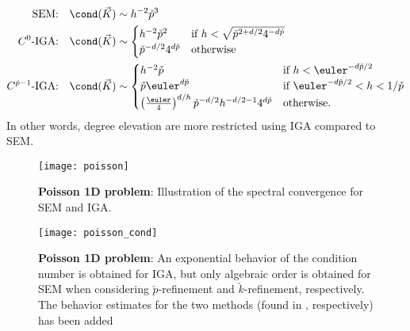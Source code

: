 \begin{align}\label{Eq5:condSEM}
	\text{SEM:}\quad&\cond(\vec{K}) \sim h^{-2}\check{p}^3\\ \label{Eq5:condIGA1}
	C^0\text{-IGA:}\quad&\cond(\vec{K}) \sim \begin{cases}
		h^{-2}\check{p}^2 & \text{if } h < \sqrt{\check{p}^{2+d/2}4^{-d\check{p}}}\\
		\check{p}^{-d/2}4^{d\check{p}} & \text{otherwise}
		\end{cases}\\ \label{Eq5:condIGA2}
	C^{\check{p}-1}\text{-IGA:}\quad&\cond(\vec{K}) \sim \begin{cases}
		h^{-2}\check{p} & \text{if } h < \euler^{-d\check{p}/2}\\
		\check{p}\euler^{d\check{p}} & \text{if } \euler^{-d\check{p}/2} < h < 1/\check{p}\\
		\left(\frac{\euler}{4}\right)^{d/h}\check{p}^{-d/2}h^{-d/2-1}4^{d\check{p}} & \text{otherwise.}
		\end{cases}
\end{align}
In other words, degree elevation are more restricted using IGA compared to SEM.
\begin{figure}
	\centering
	\texttt{[image: poisson]}
	\caption{\textbf{Poisson 1D problem}: Illustration of the spectral convergence for SEM and IGA.}
	\label{Fig5:poisson}
\end{figure}
\begin{figure}
	\centering
	\texttt{[image: poisson\_cond]}
	\caption{\textbf{Poisson 1D problem}: An exponential behavior of the condition number is obtained for IGA, but only algebraic order is obtained for SEM when considering $\check{p}$-refinement and $\check{k}$-refinement, respectively. The behavior estimates for the two methods (found in , respectively) has been added}
	\label{Fig5:poisson_cond}
\end{figure}

